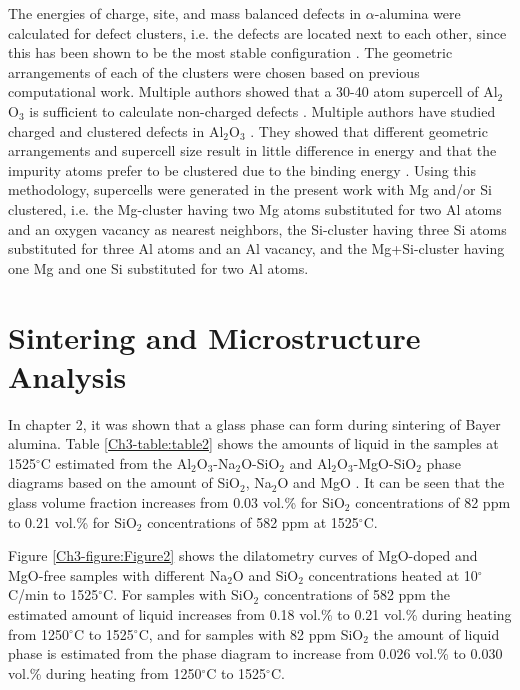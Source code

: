 The energies of charge, site, and mass balanced defects in $\alpha$-alumina were calculated for defect clusters, i.e. the defects are located next to each other, since this has been shown to be the most stable configuration \cite{Atkinson2003}. The geometric arrangements of each of the clusters were chosen based on previous computational work. Multiple authors showed that a 30-40 atom supercell of Al$_{2}$O$_{3}$ is sufficient to calculate non-charged defects \cite{Atkinson2003,Grimes1994,Lagerlof1998,Xiang2015,Sarsam2013}. Multiple authors have studied charged and clustered defects in Al$_{2}$O$_{3}$ \cite{Atkinson2003,Grimes1994,Lagerlof1998,Xiang2015,Sarsam2013}. They showed that different geometric arrangements and supercell size result in little difference in energy and that the impurity atoms prefer to be clustered due to the binding energy \cite{Atkinson2003,Grimes1994,Lagerlof1998,Xiang2015,Sarsam2013}. Using this methodology, supercells were generated in the present work with Mg and/or Si clustered, i.e. the Mg-cluster having two Mg atoms substituted for two Al atoms and an oxygen vacancy as nearest neighbors, the Si-cluster having three Si atoms substituted for three Al atoms and an Al vacancy, and the Mg+Si-cluster having one Mg and one Si substituted for two Al atoms. 

\section{Sintering and Microstructure Analysis}

In chapter 2, it was shown that a glass phase can form during sintering of Bayer alumina. Table \ref{Ch3-table:table2} shows the amounts of liquid in the samples at 1525$^{\circ}$C estimated from the Al$_{2}$O$_{3}$-Na$_{2}$O-SiO$_{2}$ and Al$_{2}$O$_{3}$-MgO-SiO$_{2}$ phase diagrams based on the amount of SiO$_{2}$, Na$_{2}$O and MgO \cite{Mao2005}. It can be seen that the glass volume fraction increases from 0.03 vol.\% for SiO$_{2}$ concentrations of 82 ppm to 0.21 vol.\% for SiO$_{2}$ concentrations of 582 ppm at 1525$^{\circ}$C. 

Figure \ref{Ch3-figure:Figure2} shows the dilatometry curves of MgO-doped and MgO-free samples with different Na$_{2}$O and SiO$_{2}$ concentrations heated at 10$^{\circ}$C/min to 1525$^{\circ}$C. For samples with SiO$_{2}$ concentrations of 582 ppm the estimated amount of liquid increases from 0.18 vol.\% to 0.21 vol.\% during heating from 1250$^{\circ}$C to 1525$^{\circ}$C, and for samples with 82 ppm SiO$_{2}$ the amount of liquid phase is estimated from the phase diagram to increase from 0.026 vol.\% to 0.030 vol.\% during heating from 1250$^{\circ}$C to 1525$^{\circ}$C. 

